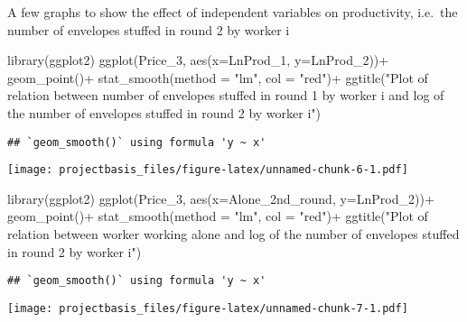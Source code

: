 \documentclass[
]{article}
\newenvironment{Shaded}{\begin{snugshade}}{\end{snugshade}}
\newcommand{\AttributeTok}[1]{\textcolor[rgb]{0.77,0.63,0.00}{#1}}
\newcommand{\FunctionTok}[1]{\textcolor[rgb]{0.00,0.00,0.00}{#1}}
\newcommand{\NormalTok}[1]{#1}
\newcommand{\SpecialCharTok}[1]{\textcolor[rgb]{0.00,0.00,0.00}{#1}}
\newcommand{\StringTok}[1]{\textcolor[rgb]{0.31,0.60,0.02}{#1}}
\begin{document}
A few graphs to show the effect of independent variables on
productivity, i.e.~the number of envelopes stuffed in round 2 by worker
i

\begin{Shaded}
\begin{Highlighting}[]
\FunctionTok{library}\NormalTok{(ggplot2)}
\FunctionTok{ggplot}\NormalTok{(Price\_3, }\FunctionTok{aes}\NormalTok{(}\AttributeTok{x=}\NormalTok{LnProd\_1, }\AttributeTok{y=}\NormalTok{LnProd\_2))}\SpecialCharTok{+}
  \FunctionTok{geom\_point}\NormalTok{()}\SpecialCharTok{+}
  \FunctionTok{stat\_smooth}\NormalTok{(}\AttributeTok{method =} \StringTok{"lm"}\NormalTok{, }\AttributeTok{col =} \StringTok{"red"}\NormalTok{)}\SpecialCharTok{+}
   \FunctionTok{ggtitle}\NormalTok{(}\StringTok{"Plot of relation between number of envelopes stuffed in round 1 by worker i and log of the number of envelopes stuffed in round 2}
\StringTok{ by worker i"}\NormalTok{)}
\end{Highlighting}
\end{Shaded}

\begin{verbatim}
## `geom_smooth()` using formula 'y ~ x'
\end{verbatim}

\texttt{[image: projectbasis\_files/figure-latex/unnamed-chunk-6-1.pdf]}

\begin{Shaded}
\begin{Highlighting}[]
\FunctionTok{library}\NormalTok{(ggplot2)}
\FunctionTok{ggplot}\NormalTok{(Price\_3, }\FunctionTok{aes}\NormalTok{(}\AttributeTok{x=}\NormalTok{Alone\_2nd\_round, }\AttributeTok{y=}\NormalTok{LnProd\_2))}\SpecialCharTok{+}
  \FunctionTok{geom\_point}\NormalTok{()}\SpecialCharTok{+}
  \FunctionTok{stat\_smooth}\NormalTok{(}\AttributeTok{method =} \StringTok{"lm"}\NormalTok{, }\AttributeTok{col =} \StringTok{"red"}\NormalTok{)}\SpecialCharTok{+}
   \FunctionTok{ggtitle}\NormalTok{(}\StringTok{"Plot of relation between worker working alone and log of the number of envelopes stuffed in round 2}
\StringTok{ by worker i"}\NormalTok{)}
\end{Highlighting}
\end{Shaded}

\begin{verbatim}
## `geom_smooth()` using formula 'y ~ x'
\end{verbatim}

\texttt{[image: projectbasis\_files/figure-latex/unnamed-chunk-7-1.pdf]}
\end{document}
